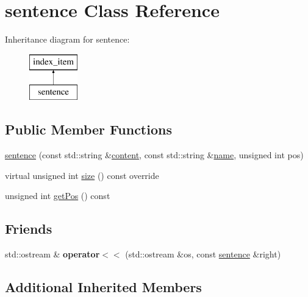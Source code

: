 \hypertarget{classsentence}{}\section{sentence Class Reference}
\label{classsentence}
Inheritance diagram for sentence\+:\begin{figure}[H]
\begin{center}
\leavevmode
\includegraphics[height=2.000000cm]{classsentence}
\end{center}
\end{figure}
\subsection*{Public Member Functions}
\begin{DoxyCompactItemize}
\item 
\hyperlink{classsentence_af1d2a2e74a81d3a9d186f4076b89a4c7}{sentence} (const std\+::string \&\hyperlink{classindex__item_aafe86cc0ad7284d6db317588f63d1cb2}{content}, const std\+::string \&\hyperlink{classindex__item_a1bcb5c577c3986549330c3aa283a6a5e}{name}, unsigned int pos)
\item 
virtual unsigned int \hyperlink{classsentence_afbe71af6de10ac098acaca7be2adf517}{size} () const override
\item 
unsigned int \hyperlink{classsentence_a30b8697a186d696ba271e4c476528956}{get\+Pos} () const
\end{DoxyCompactItemize}
\subsection*{Friends}
\begin{DoxyCompactItemize}
\item 
\mbox{\label{classsentence_a032ddfe7c4f2883ed286febfdb74cad8}} 
std\+::ostream \& {\bfseries operator$<$$<$} (std\+::ostream \&os, const \hyperlink{classsentence}{sentence} \&right)
\end{DoxyCompactItemize}
\subsection*{Additional Inherited Members}


